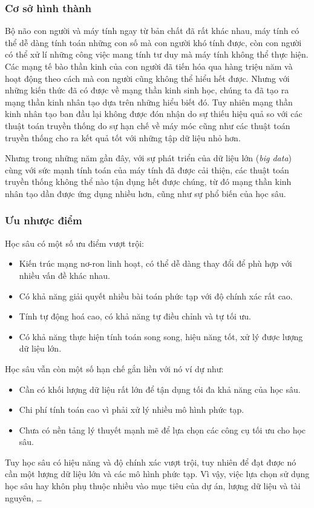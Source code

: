 \subsubsection{Cơ sở hình thành}
Bộ não con người và máy tính ngay từ bản chất đã rất khác nhau, máy tính có thể dễ dàng tính toán những con số mà con người khó tính được, còn con người có thể xử lí những công việc mang tính tư duy mà máy tính không thể thực hiện. Các mạng tế bào thần kinh của con người đã tiến hóa qua hàng triệu năm và hoạt động theo cách mà con người cũng không thể hiểu hết được. Nhưng với những kiến thức đã có được về mạng thần kinh sinh học, chúng ta đã tạo ra mạng thần kinh nhân tạo dựa trên những hiểu biết đó. Tuy nhiên mạng thần kinh nhân tạo ban đầu lại không được đón nhận do sự thiếu hiệu quả so với các thuật toán truyền thống do sự hạn chế về máy móc cũng như các thuật toán truyền thống cho ra kết quả tốt với những tập dữ liệu nhỏ hơn.

Nhưng trong những năm gần đây, với sự phát triển của dữ liệu lớn (\textit{big data}) cùng với sức mạnh tính toán của máy tính đã được cải thiện, các thuật toán truyền thống không thể nào tận dụng hết được chúng, từ đó mạng thần kinh nhân tạo dần được ứng dụng nhiều hơn, cũng như sự phổ biến của học sâu.\cite{Aggarwal2022-xj}

\subsubsection{Ưu nhược điểm}
Học sâu có một số ưu điểm vượt trội:
\begin{itemize}
    \item Kiến trúc mạng nơ-ron linh hoạt, có thể dễ dàng thay đổi để phù hợp với nhiều vấn đề khác nhau.
    \item Có khả năng giải quyết nhiều bài toán phức tạp với độ chính xác rất cao.
    \item Tính tự động hoá cao, có khả năng tự điều chỉnh và tự tối ưu.
    \item Có khả năng thực hiện tính toán song song, hiệu năng tốt, xử lý được lượng dữ liệu lớn.
\end{itemize}

Học sâu vẫn còn một số hạn chế gắn liền với nó ví dự như:
\begin{itemize}
    \item Cần có khối lượng dữ liệu rất lớn để tận dụng tối đa khả năng của học sâu.
    \item Chi phí tính toán cao vì phải xử lý nhiều mô hình phức tạp.
    \item Chưa có nền tảng lý thuyết mạnh mẽ để lựa chọn các công cụ tối ưu cho học sâu.
\end{itemize}

Tuy học sâu có hiệu năng và độ chính xác vượt trội, tuy nhiên để đạt được nó cần một lượng dữ liệu lớn và các mô hình phức tạp. Vì vậy, việc lựa chọn sử dụng học sâu hay khôn phụ thuộc nhiều vào mục tiêu của dự án, lượng dữ liệu và tài nguyên, \dots\cite{webpage10}
